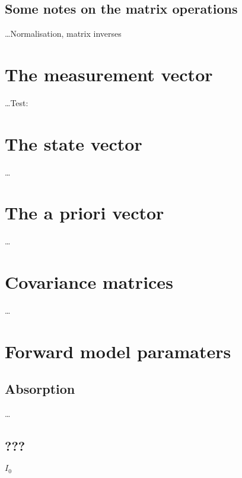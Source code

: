 \subsection{Some notes on the matrix operations}
\label{sec:matrixops}
%
\dots Normalisation, matrix inverses




\section{The measurement vector}
\label{sec:y}
%
\dots Test: \MsrVct


\section{The state vector}
\label{sec:x}
%
\dots


\section{The a priori vector}
\label{sec:x}
%
\dots


\section{Covariance matrices}
\label{sec:x}
%
\dots



\section{Forward model paramaters}
\label{sec:b}


\subsection{Absorption}
\label{sec:b:abs}
%
\dots






\subsection{???}
\label{sec:b:???}
%
$I_0$




